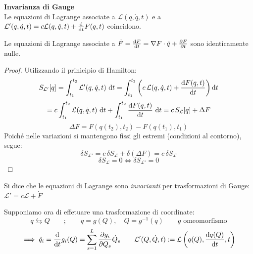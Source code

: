 \begin{theorem}
    \textbf{Invarianza di Gauge}\\
    Le equazioni di Lagrange associate a $\mathcal{L}(q,\dot{q},t)$ e a
     $\mathcal{L}'(q,\dot{q},t)=c\mathcal{L}(q,\dot{q},t)+ \dv{t}F(q,t)$ coincidono.
\end{theorem}
\begin{remark}
    Le equazioni di Lagrange associate a $\dot{F}= \dv{F}{t}(q(t),t)= \nabla F \cdot \dot{q}+\pdv{F}{t}$ sono identicamente nulle.
\end{remark}
\begin{proof}
    Utilizzando il prinicipio di Hamilton:
    \begin{equation*}
        S_{\mathcal{L}'}[q] = \int_{t_1}^{t_2} \mathcal{L}'(q, \dot{q}, t) \, \dd{t}
        = \int_{t_1}^{t_2} \left( c \, \mathcal{L}(q, \dot{q}, t) + \dv{F(q,t)}{t} \right) \dd{t}
    \end{equation*}
    \begin{equation*}
        = c \int_{t_1}^{t_2} \mathcal{L}(q, \dot{q}, t) \, \dd{t} + \int_{t_1}^{t_2} \dv{F(q,t)}{t} \, \dd{t}
        = c \, S_\mathcal{L}[q] + \Delta F
    \end{equation*}
    \begin{equation*}
        \Delta F = F(q(t_2), t_2) - F(q(t_1), t_1)
    \end{equation*}
    Poiché nelle variazioni si mantengono fissi gli estremi (condizioni al contorno), segue:
    \begin{equation*}
        \delta S_{\mathcal{L}'} = c \, \delta S_\mathcal{L} + \delta(\Delta F) = c \, \delta S_\mathcal{L}
    \end{equation*}
    \begin{equation*}
        \delta S_\mathcal{L} = 0 \iff \delta S_{\mathcal{L}'} = 0
    \end{equation*}
\end{proof}

\begin{definition}
    Si dice che le equazioni di Lagrange sono \textit{invarianti} per trasformazioni di Gauge: $\mathcal{L}'= c\mathcal{L}+ \dot{F}$
\end{definition}

Supponiamo ora di effetuare una trasformazione di coordinate:
\begin{equation*}
    q \leftrightarrows Q \qquad ; \qquad q = g(Q), \quad Q = g^{-1}(q) \qquad g \text{ omeomorfismo}
\end{equation*}
\begin{equation*}
    \implies \dot{q}_i = \dv{t} g_i(Q) = \sum_{s = 1}^L \pdv{g_i}{Q_s} \dot{Q}_s \qquad
    \mathcal{L}'(Q, \dot{Q}, t) := \mathcal{L}\left( q(Q), \dv{q(Q)}{t}, t \right)
\end{equation*}

